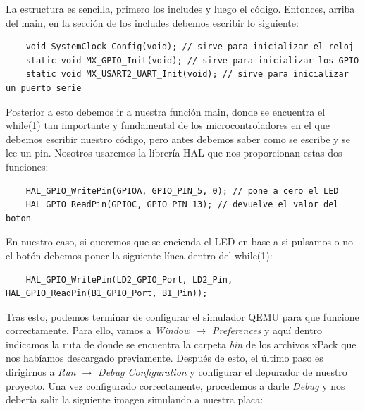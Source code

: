 \documentclass[11pt,a4paper]{article}
\begin{document}
	La estructura es sencilla, primero los includes y luego el código. Entonces, arriba del main, en la sección de los includes debemos escribir lo siguiente:
	\begin{lstlisting}
	void SystemClock_Config(void); // sirve para inicializar el reloj
	static void MX_GPIO_Init(void); // sirve para inicializar los GPIO
	static void MX_USART2_UART_Init(void); // sirve para inicializar un puerto serie
	\end{lstlisting}
	\vspace{1em}
	
	Posterior a esto debemos ir a nuestra función main, donde se encuentra el while(1) tan importante y fundamental de los microcontroladores en el que debemos escribir nuestro código, pero antes debemos saber como se escribe y se lee un pin. Nosotros usaremos la librería HAL que nos proporcionan estas dos funciones:
	\begin{lstlisting}
	HAL_GPIO_WritePin(GPIOA, GPIO_PIN_5, 0); // pone a cero el LED
	HAL_GPIO_ReadPin(GPIOC, GPIO_PIN_13); // devuelve el valor del boton
	\end{lstlisting}
	\vspace{1em}
	
	En nuestro caso, si queremos que se encienda el LED en base a si pulsamos o no el botón debemos poner la siguiente línea dentro del while(1):
	\begin{lstlisting}
	HAL_GPIO_WritePin(LD2_GPIO_Port, LD2_Pin, HAL_GPIO_ReadPin(B1_GPIO_Port, B1_Pin));
	\end{lstlisting}
	\vspace{1em}
	
	Tras esto, podemos terminar de configurar el simulador QEMU para que funcione correctamente. Para ello, vamos a \textit{Window $\rightarrow$ Preferences} y aquí dentro indicamos la ruta de donde se encuentra la carpeta \textit{bin} de los archivos xPack que nos habíamos descargado previamente. Después de esto, el último paso es dirigirnos a \textit{Run $\rightarrow$ Debug Configuration} y configurar el depurador de nuestro proyecto. Una vez configurado correctamente, procedemos a darle \textit{Debug} y nos debería salir la siguiente imagen simulando a nuestra placa:
	
\end{document}
